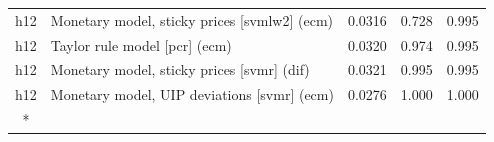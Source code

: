 \begin{ThreePartTable}
\begin{longtable}[t]{cp{5.5cm}ccc}
h12 & \raggedright Monetary model, sticky prices [svmlw2] (ecm) & 0.0316 & 0.728 & 0.995\\
h12 & \raggedright Taylor rule model [pcr] (ecm) & 0.0320 & 0.974 & 0.995\\
h12 & \raggedright Monetary model, sticky prices [svmr] (dif) & 0.0321 & 0.995 & 0.995\\
h12 & \raggedright Monetary model, UIP deviations [svmr] (ecm) & 0.0276 & 1.000 & 1.000\\*
\end{longtable}
\end{ThreePartTable}
\endgroup{}
